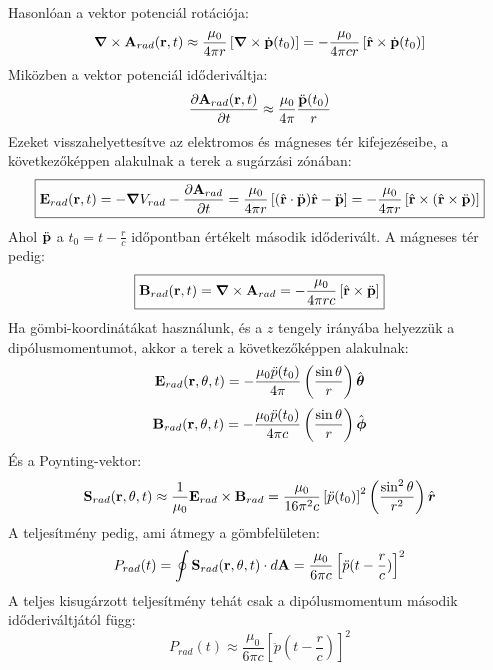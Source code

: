 \documentclass[../main.tex]{subfiles}
\begin{document}
Hasonlóan a vektor potenciál rotációja:
\begin{equation}
    \boldsymbol{\nabla} \times \bold{A}_{rad}(\bold{r}, t) \approx \frac{\mu_0}{4 \pi r} \left[\boldsymbol{\nabla} \times \dot{\bold{p}}(t_0) \right] = - \frac{\mu_0}{4 \pi c r} \left[\hat{\bold{r}} \times\dot{\bold{p}}(t_0) \right]
\end{equation}
Miközben a vektor potenciál időderiváltja:
\begin{equation}
    \frac{\partial \bold{A}_{rad}(\bold{r}, t)}{\partial t} \approx \frac{\mu_0}{4 \pi} \frac{\ddot{\bold{p}}(t_0)}{r}
\end{equation}
Ezeket visszahelyettesítve az elektromos és mágneses tér kifejezéseibe, a következőképpen alakulnak a terek a sugárzási zónában:
\begin{equation}
    \boxed{\bold{E}_{rad}(\bold{r}, t) = - \boldsymbol{\nabla} V_{rad} - \frac{\partial \bold{A}_{rad}}{\partial t} = \frac{\mu_0}{4 \pi r} \left[(\hat{\bold{r}} \cdot \ddot{\bold{p}})\hat{\bold{r}} - \ddot{\bold{p}}\right] = - \frac{\mu_0}{4 \pi r} \left[\hat{\bold{r}} \times (\hat{\bold{r}} \times \ddot{\bold{p}})\right]}
\end{equation}
Ahol $\ddot{\bold{p}}$ a $t_0 = t - \frac{r}{c}$ időpontban értékelt második időderivált. A mágneses tér pedig:
\begin{equation}
    \boxed{\bold{B}_{rad}(\bold{r}, t) = \boldsymbol{\nabla} \times \bold{A}_{rad} = - \frac{\mu_0}{4 \pi r c} \left[\hat{\bold{r}} \times \ddot{\bold{p}}\right]}
\end{equation}
Ha gömbi-koordinátákat használunk, és a $z$ tengely irányába helyezzük a dipólusmomentumot, akkor a terek a következőképpen alakulnak:
        \begin{equation}
            \bold{E}_{rad}(\bold{r}, \theta, t) = - \frac{\mu_0 \ddot{p}(t_0)}{4 \pi} \left(\frac{\sin \theta}{r}\right) \hat{\boldsymbol{\theta}}
\end{equation}
\begin{equation}
    \bold{B}_{rad}(\bold{r}, \theta, t) = - \frac{\mu_0 \ddot{p}(t_0)}{4 \pi c} \left(\frac{\sin \theta}{r}\right) \hat{\boldsymbol{\phi}}
\end{equation}
És a Poynting-vektor:
\begin{equation}
    \bold{S}_{rad}(\bold{r}, \theta, t) \approx \frac{1}{\mu_0} \bold{E}_{rad} \times \bold{B}_{rad} = \frac{\mu_0}{16 \pi^2 c} \left[\ddot{p}(t_0)\right]^2 \left(\frac{\sin^2 \theta}{r^2}\right) \hat{\boldsymbol{r}}
\end{equation}
A teljesítmény pedig, ami átmegy a gömbfelületen:
\begin{equation}
    P_{rad}(t) = \oint \bold{S}_{rad}(\bold{r}, \theta, t) \cdot d\bold{A} = \frac{\mu_0}{6 \pi c} \left[\ddot{p}(t - \frac{r}{c})\right]^2
\end{equation}
A teljes kisugárzott teljesítmény tehát csak a dipólusmomentum második időderiváltjától függ:
\begin{equation}
    P_{rad}(t) \approx \frac{\mu_0}{6 \pi c} \left[\ddot{p}(t - \frac{r}{c})\right]^2
\end{equation}
\end{document}
